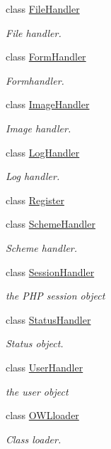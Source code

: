\begin{DoxyCompactItemize}
class \hyperlink{classFileHandler}{FileHandler}
\begin{DoxyCompactList}\small\item\em File handler. \item\end{DoxyCompactList}\item 
class \hyperlink{classFormHandler}{FormHandler}
\begin{DoxyCompactList}\small\item\em Formhandler. \item\end{DoxyCompactList}\item 
class \hyperlink{classImageHandler}{ImageHandler}
\begin{DoxyCompactList}\small\item\em Image handler. \item\end{DoxyCompactList}\item 
class \hyperlink{classLogHandler}{LogHandler}
\begin{DoxyCompactList}\small\item\em Log handler. \item\end{DoxyCompactList}\item 
class \hyperlink{classRegister}{Register}
\item 
class \hyperlink{classSchemeHandler}{SchemeHandler}
\begin{DoxyCompactList}\small\item\em Scheme handler. \item\end{DoxyCompactList}\item 
class \hyperlink{classSessionHandler}{SessionHandler}
\begin{DoxyCompactList}\small\item\em the PHP session object \item\end{DoxyCompactList}\item 
class \hyperlink{classStatusHandler}{StatusHandler}
\begin{DoxyCompactList}\small\item\em Status object. \item\end{DoxyCompactList}\item 
class \hyperlink{classUserHandler}{UserHandler}
\begin{DoxyCompactList}\small\item\em the user object \item\end{DoxyCompactList}\item 
class \hyperlink{classOWLloader}{OWLloader}
\begin{DoxyCompactList}\small\item\em Class loader. \item\end{DoxyCompactList}\end{DoxyCompactItemize}
